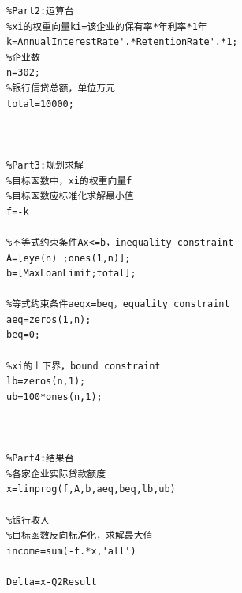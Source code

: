 \begin{appendices}
\begin{tcolorbox}[breakable]
\begin{verbatim}
%Part2:运算台
%xi的权重向量ki=该企业的保有率*年利率*1年
k=AnnualInterestRate'.*RetentionRate'.*1;
%企业数
n=302;
%银行信贷总额，单位万元
total=10000;



%Part3:规划求解
%目标函数中，xi的权重向量f
%目标函数应标准化求解最小值
f=-k

%不等式约束条件Ax<=b，inequality constraint
A=[eye(n) ;ones(1,n)];
b=[MaxLoanLimit;total];

%等式约束条件aeqx=beq，equality constraint
aeq=zeros(1,n);
beq=0;

%xi的上下界，bound constraint
lb=zeros(n,1);
ub=100*ones(n,1);



%Part4:结果台
%各家企业实际贷款额度
x=linprog(f,A,b,aeq,beq,lb,ub)

%银行收入
%目标函数反向标准化，求解最大值
income=sum(-f.*x,'all')

Delta=x-Q2Result
	\end{verbatim}
	\end{tcolorbox}


\end{appendices}


\ifx\allfiles\undefined

\fi